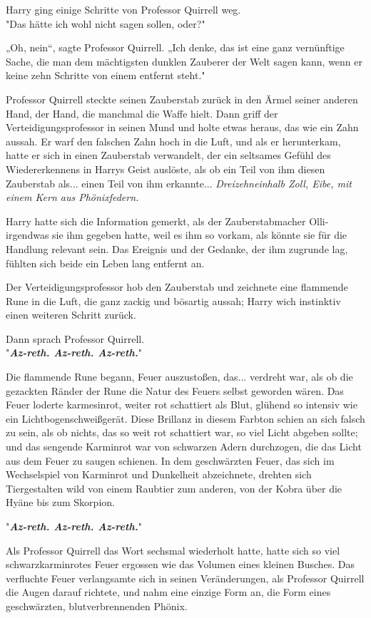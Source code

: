 {Harry ging einige Schritte von Professor Quirrell weg.\\ "Das hätte ich wohl nicht sagen sollen, oder?"

„Oh, nein“, sagte Professor Quirrell. „Ich denke, das ist eine ganz vernünftige Sache, die man dem mächtigsten dunklen Zauberer der Welt sagen kann, wenn er keine zehn Schritte von einem entfernt steht."

Professor Quirrell steckte seinen Zauberstab zurück in den Ärmel seiner anderen Hand, der Hand, die manchmal die Waffe hielt. Dann griff der Verteidigungsprofessor in seinen Mund und holte etwas heraus, das wie ein Zahn aussah. Er warf den falschen Zahn hoch in die Luft, und als er herunterkam, hatte er sich in einen Zauberstab verwandelt, der ein seltsames Gefühl des Wiedererkennens in Harrys Geist auslöste, als ob ein Teil von ihm diesen Zauberstab als... einen Teil von ihm erkannte... \emph{Dreizehneinhalb Zoll, Eibe, mit einem Kern aus Phönixfedern.}

Harry hatte sich die Information gemerkt, als der Zauberstabmacher Olli-irgendwas sie ihm gegeben hatte, weil es ihm so vorkam, als könnte sie für die Handlung relevant sein. Das Ereignis und der Gedanke, der ihm zugrunde lag, fühlten sich beide ein Leben lang entfernt an.

Der Verteidigungsprofessor hob den Zauberstab und zeichnete eine flammende Rune in die Luft, die ganz zackig und bösartig aussah; Harry wich instinktiv einen weiteren Schritt zurück.

Dann sprach Professor Quirrell.\\ "\textbf{\emph{Az-reth. Az-reth. Az-reth.}}"

Die flammende Rune begann, Feuer auszustoßen, das... verdreht war, als ob die gezackten Ränder der Rune die Natur des Feuers selbst geworden wären. Das Feuer loderte karmesinrot, weiter rot schattiert als Blut, glühend so intensiv wie ein Lichtbogenschweißgerät. Diese Brillanz in diesem Farbton schien an sich falsch zu sein, als ob nichts, das so weit rot schattiert war, so viel Licht abgeben sollte; und das sengende Karminrot war von schwarzen Adern durchzogen, die das Licht aus dem Feuer zu saugen schienen. In dem geschwärzten Feuer, das sich im Wechselspiel von Karminrot und Dunkelheit abzeichnete, drehten sich Tiergestalten wild von einem Raubtier zum anderen, von der Kobra über die Hyäne bis zum Skorpion.

"\textbf{\emph{Az-reth. Az-reth. Az-reth.}}"

Als Professor Quirrell das Wort sechsmal wiederholt hatte, hatte sich so viel schwarzkarminrotes Feuer ergossen wie das Volumen eines kleinen Busches. Das verfluchte Feuer verlangsamte sich in seinen Veränderungen, als Professor Quirrell die Augen darauf richtete, und nahm eine einzige Form an, die Form eines geschwärzten, blutverbrennenden Phönix.

}

